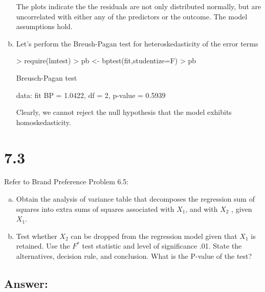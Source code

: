 \documentclass{article}
\begin{document}
\begin{enumerate}[a)]
The plots indicate the the residuals are not only distributed normally, but are uncorrelated with either any of the predictors or the outcome. The model assumptions hold.

\item{} Let's perform the Breush-Pagan test for heteroskedasticity of the error terms

\begin{Schunk}
\begin{Sinput}
> require(lmtest)
> pb <- bptest(fit,studentize=F)
> pb
\end{Sinput}
\begin{Soutput}
	Breusch-Pagan test

data:  fit
BP = 1.0422, df = 2, p-value = 0.5939
\end{Soutput}
\end{Schunk}

Clearly, we cannot reject the null hypothesis that the model exhibits homoskedasticity.

\end{enumerate}

\section{7.3}

Refer to Brand Preference Problem 6.5:

\begin{enumerate}[a)]
\item{} Obtain the analysis of variance table that decomposes the regression sum of squares into extra sums of squares associated with $X_1$, and with $X_2$ , given $X_1$.
\item{} Test whether $X_2$ can be dropped from the regression model given that $X_1$ is retained. Use the $F^*$ test statistic and level of significance .01. State the alternatives, decision rule, and conclusion. What is the P-value of the test?
\end{enumerate}

\subsection{Answer:}
\end{document}
